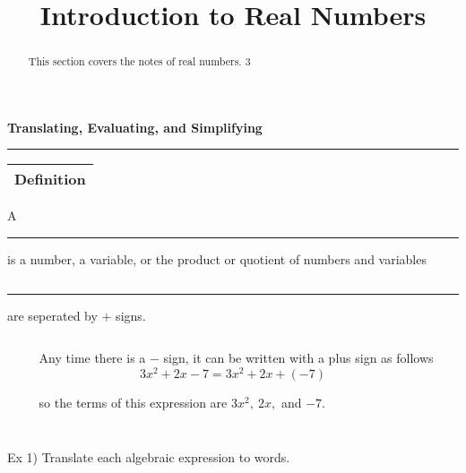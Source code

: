 \documentclass{ximera}
\title{Introduction to Real Numbers}
\begin{document}
\begin{abstract}
This section covers the notes of real numbers. 3
\end{abstract}


{\LARGE \hspace{1in} \textbf{ Translating, Evaluating, and Simplifying}}

\noindent \rule{7.35in}{2pt}

\vspace{.2in}

\noindent \begin{tabular}{|c|}
\hline 
Definition\\
\hline 
\end{tabular} A \rule{1in}{.5pt} is a number, a variable, or the product or quotient of numbers and variables

$~$

\rule{1in}{.5pt} are seperated by $\displaystyle +$ signs.

$~$

$~~~~~~~~~~$ Any time there is a $\displaystyle -$ sign, it can be written with a plus sign as follows $$3x^2+2x-7=3x^2+2x+(-7)$$ 

$~~~~~~~~~~$ so the terms of this expression are $3x^2, ~ 2x,$ and $-7$.

$~$

$~$



\noindent Ex 1)  Translate each algebraic expression to words.

$~$
\end{document}
